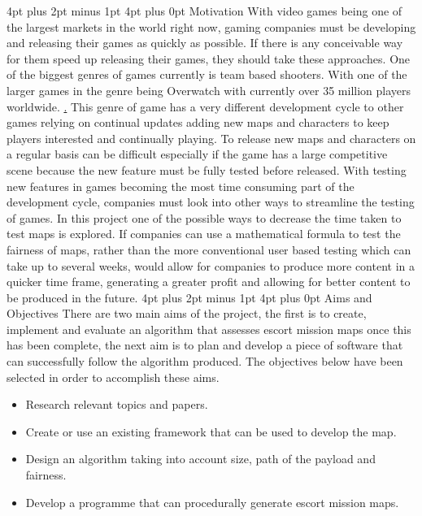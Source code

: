 \documentclass[12pt,a4paper,oneside]{book}
\makeatletter
\renewcommand\section{\@startsection {section}{1}{0mm} %
                               {4pt plus 2pt minus 1pt} %
                               {4pt plus 0pt} %
                               {\bfseries}}
\makeatother
\begin{document}
\section{Motivation}
With video games being one of the largest markets in the world right now, gaming companies must be developing and releasing their games as quickly as possible. If there is any conceivable way for them speed up releasing their games, they should take these approaches.
\vspace{5mm} 
\newline  
One of the biggest genres of games currently is team based shooters. With one of the larger games in the genre being Overwatch with currently over 35 million players worldwide. \href{https://twitter.com/PlayOverwatch/status/919925924769906688}. This genre of game has a very different development cycle to other games relying on continual updates adding new maps and characters to keep players interested and continually playing. To release new maps and characters on a regular basis can be difficult especially if the game has a large competitive scene because the new feature \vspace{5mm} must be fully tested before released.
\newline  
With testing new features in games becoming the most time consuming part of the development cycle, companies must look into other ways to streamline the testing of games. In this project one of the possible ways to decrease the time taken to test maps is explored. If companies can use a mathematical formula to test the fairness of maps, rather than the more conventional user based testing which can take up to several weeks, would allow for companies to produce more content in a quicker time frame, generating a greater profit and allowing for better content to be produced in the future. 
\section{Aims and Objectives}
There are two main aims of the project, the first is to create, implement and evaluate an algorithm that assesses escort mission maps once this has been complete, the next aim is to plan and develop a piece of software that can successfully follow the algorithm produced. The objectives below have been selected in order to accomplish these aims.
\begin{itemize}
	\item Research relevant topics and papers.
	\item Create or use an existing framework that can be used to develop the map.
	\item Design an algorithm taking into account size, path of the payload and fairness. 
	\item Develop a programme that can procedurally generate escort mission maps.	
\end{itemize}
\end{document}
